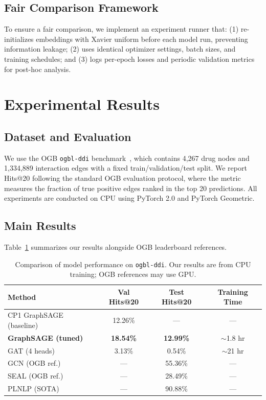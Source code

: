 \documentclass{article}
\begin{document}
\subsection{Fair Comparison Framework}

To ensure a fair comparison, we implement an experiment runner that: (1) re-initializes embeddings with Xavier uniform before each model run, preventing information leakage; (2) uses identical optimizer settings, batch sizes, and training schedules; and (3) logs per-epoch losses and periodic validation metrics for post-hoc analysis.


\section{Experimental Results}

\subsection{Dataset and Evaluation}

We use the OGB \texttt{ogbl-ddi} benchmark~\citep{hu2020open}, which contains 4,267 drug nodes and 1,334,889 interaction edges with a fixed train/validation/test split. We report Hits@20 following the standard OGB evaluation protocol, where the metric measures the fraction of true positive edges ranked in the top 20 predictions. All experiments are conducted on CPU using PyTorch 2.0 and PyTorch Geometric.

\subsection{Main Results}

Table~\ref{tab:results} summarizes our results alongside OGB leaderboard references.

\begin{table}[h]
\centering
\caption{Comparison of model performance on \texttt{ogbl-ddi}. Our results are from CPU training; OGB references may use GPU.}
\label{tab:results}
\begin{tabular}{@{}lccc@{}}
\toprule
\textbf{Method} & \textbf{Val Hits@20} & \textbf{Test Hits@20} & \textbf{Training Time} \\
\midrule
CP1 GraphSAGE (baseline) & 12.26\% & --- & --- \\
\textbf{GraphSAGE (tuned)} & \textbf{18.54\%} & \textbf{12.99\%} & $\sim$1.8 hr \\
GAT (4 heads) & 3.13\% & 0.54\% & $\sim$21 hr \\
\midrule
GCN (OGB ref.) & --- & 55.36\% & --- \\
SEAL (OGB ref.) & --- & 28.49\% & --- \\
PLNLP (SOTA) & --- & 90.88\% & --- \\
\bottomrule
\end{tabular}
\end{table}
\end{document}
